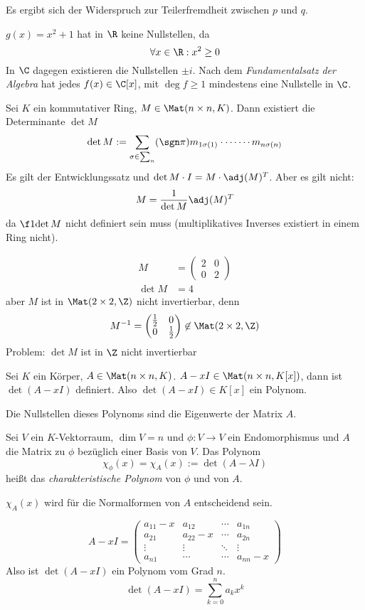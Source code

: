 \documentclass[a4paper, 10pt]{scrbook}
\begin{document}
Es ergibt sich der Widerspruch zur Teilerfremdheit zwischen $p$ und $q$.

$g(x)=x^2+1$ hat in $\R$ keine Nullstellen, da
\[
\forall x\in\R:x^2\ge 0
\]
In $\C$ dagegen existieren die Nullstellen $\pm i$.
Nach dem \emph{Fundamentalsatz der Algebra} hat jedes $f(x)\in \C[x]$, mit $\deg f\ge 1$ mindestens eine Nullstelle in $\C$.

Sei $K$ ein kommutativer Ring, $M\in \Mat(n\times n, K)$.
Dann existiert die Determinante $\det M$
\[
\det M := \sum_{\sigma\in\sum_n}(\sgn\pi)m_{1\sigma(1)}\cdot\dotsb\cdots m_{n\sigma(n)}
\]
Es gilt der Entwicklungssatz und $\det M \cdot I = M\cdot \adj(M)^T$.
Aber es gilt nicht:
\[
M=\frac 1{\det M}\adj(M)^T
\]
da $\f 1{\det M}$ nicht definiert sein muss (multiplikatives Inverses existiert in einem Ring nicht).

\begin{ex}
\begin{align*}
M&=\begin{pmatrix}2&0\\0&2\end{pmatrix}\\
\det M&=4
\end{align*}
aber $M$ ist in $\Mat(2\times 2,\Z)$ nicht invertierbar, denn
\[
M^{-1} =\begin{pmatrix}\frac 12&0\\0&\frac 12\end{pmatrix} \not\in \Mat(2\times 2,\Z)
\]
Problem: $\det M$ ist in $\Z$ nicht invertierbar
\end{ex}

Sei $K$ ein Körper, $A\in \Mat(n\times n, K)$. $A-xI \in \Mat(n\times n,K[x])$, dann ist
$\det(A-xI)$ definiert.
Also $\det(A-xI)\in K[x]$ ein Polynom.

Die Nullstellen dieses Polynoms sind die Eigenwerte der Matrix $A$.

\begin{df}
\label{df:10.16}
Sei $V$ ein $K$-Vektorraum, $\dim V=n$ und $\phi:V\to V$ ein Endomorphismus und $A$ die Matrix zu $\phi$ bezüglich einer Basis von $V$.
Das Polynom
\[
\chi_{\phi}(x) = \chi_{A}(x) := \det(A-\lambda I)
\]
heißt das \emph{charakteristische Polynom} von $\phi$ und von $A$.
\end{df}

$\chi_A(x)$ wird für die Normalformen von $A$ entscheidend sein.

\[
A-xI = \begin{pmatrix}
a_{11}-x & a_{12} &\cdots & a_{1n}\\
a_{21}& a_{22}-x & \cdots & a_{2n}\\
\vdots & \vdots & \ddots & \vdots \\
a_{n1}&\cdots &\cdots & a_{nn}-x
\end{pmatrix}
\]
Also ist $\det(A-xI)$ ein Polynom vom Grad $n$.
\[
\det(A-xI)=\sum_{k=0}^na_kx^k
\]
\end{document}
